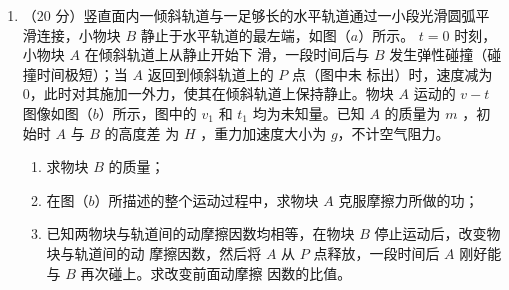 \begin{enumerate}
{\begin{enumerate}
\end{enumerate}


}


\newpage
\item 
（$ 20 $ 分）竖直面内一倾斜轨道与一足够长的水平轨道通过一小段光滑圆弧平滑连接，小物块 $ B $
静止于水平轨道的最左端，如图（$ a $）所示。 $ t=0 $ 时刻，小物块 $ A $ 在倾斜轨道上从静止开始下
滑，一段时间后与 $ B $ 发生弹性碰撞（碰撞时间极短）；当 $ A $ 返回到倾斜轨道上的 $ P $ 点（图中未
标出）时，速度减为 $ 0 $，此时对其施加一外力，使其在倾斜轨道上保持静止。物块 $ A $ 运动的 $ v-t $
图像如图（$ b $）所示，图中的 $ v_{1} $ 和 $ t_{1} $ 均为未知量。已知 $ A $ 的质量为 $ m $ ，初始时 $ A $ 与 $ B $ 的高度差
为 $ H $ ，重力加速度大小为 $ g $，不计空气阻力。



\begin{enumerate}
\renewcommand{\labelenumi}{\arabic{enumi}.}
\item
求物块 $ B $ 的质量；



\item 
在图（$ b $）所描述的整个运动过程中，求物块 $ A $ 克服摩擦力所做的功；


\item 
已知两物块与轨道间的动摩擦因数均相等，在物块 $ B $ 停止运动后，改变物块与轨道间的动
摩擦因数，然后将 $ A $ 从 $ P $ 点释放，一段时间后 $ A $ 刚好能与 $ B $ 再次碰上。求改变前面动摩擦
因数的比值。





\end{enumerate}
\begin{figure}[h!]
\flushright

\end{figure}

\end{enumerate}
